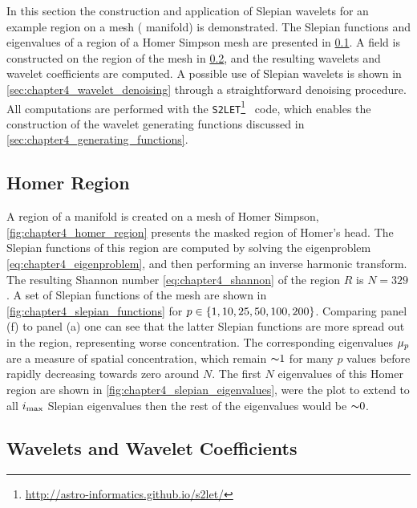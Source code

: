 In this section the construction and application of Slepian wavelets for an example region on a mesh (\cf{} manifold) is demonstrated.
The Slepian functions and eigenvalues of a region of a Homer Simpson mesh are presented in \cref{sec:chapter4_homer_region}.
A field is constructed on the region of the mesh in \cref{sec:chapter4_wavelets_wavelet_coefficients}, and the resulting wavelets and wavelet coefficients are computed.
A possible use of Slepian wavelets is shown in \cref{sec:chapter4_wavelet_denoising} through a straightforward denoising procedure.
All computations are performed with the \texttt{S2LET}\footnote{\url{http://astro-informatics.github.io/s2let/}}~\cite{Leistedt2013} code, which enables the construction of the wavelet generating functions discussed in \cref{sec:chapter4_generating_functions}.

\subsection{Homer Region}\label{sec:chapter4_homer_region}

A region of a manifold is created on a mesh of Homer Simpson, \cref{fig:chapter4_homer_region} presents the masked region of Homer's head.
The Slepian functions of this region are computed by solving the eigenproblem \cref{eq:chapter4_eigenproblem}, and then performing an inverse harmonic transform.
The resulting Shannon number \cref{eq:chapter4_shannon} of the region \(R\) is \(N=329\).
A set of Slepian functions of the mesh are shown in \cref{fig:chapter4_slepian_functions} for \(p \in \{1, 10, 25, 50, 100, 200\}\).
Comparing panel (f) to panel (a) one can see that the latter Slepian functions are more spread out in the region, representing worse concentration.
The corresponding eigenvalues \({\mu}_{p}\) are a measure of spatial concentration, which remain \({\thicksim}1\) for many \(p\) values before rapidly decreasing towards zero around \(N\).
The first \(N\) eigenvalues of this Homer region are shown in \cref{fig:chapter4_slepian_eigenvalues}, were the plot to extend to all \(i_{\text{max}}{}\) Slepian eigenvalues then the rest of the eigenvalues would be \({\thicksim}0\).







\subsection{Wavelets and Wavelet Coefficients}\label{sec:chapter4_wavelets_wavelet_coefficients}

